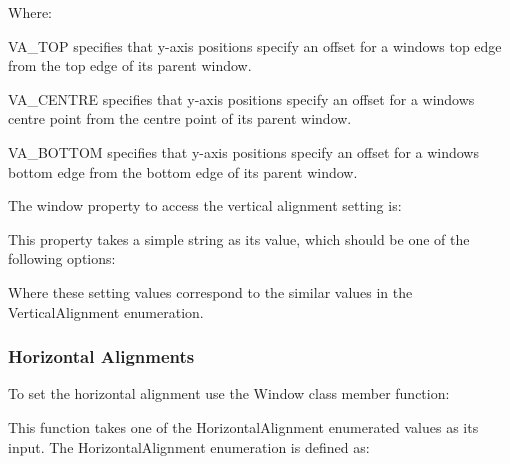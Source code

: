 Where\+: \begin{DoxyItemize}
\item {\ttfamily V\+A\+\_\+\+T\+OP} specifies that y-\/axis positions specify an offset for a window\textquotesingle{}s top edge from the top edge of it\textquotesingle{}s parent window. \item {\ttfamily V\+A\+\_\+\+C\+E\+N\+T\+RE} specifies that y-\/axis positions specify an offset for a window\textquotesingle{}s centre point from the centre point of it\textquotesingle{}s parent window. \item {\ttfamily V\+A\+\_\+\+B\+O\+T\+T\+OM} specifies that y-\/axis positions specify an offset for a window\textquotesingle{}s bottom edge from the bottom edge of it\textquotesingle{}s parent window.\end{DoxyItemize}
The window property to access the vertical alignment setting is\+: 
\begin{DoxyCode}{0}
\DoxyCodeLine{\textcolor{stringliteral}{"VerticalAlignment"}}
\end{DoxyCode}
 This property takes a simple string as its value, which should be one of the following options\+: 
\begin{DoxyCode}{0}
\DoxyCodeLine{\textcolor{stringliteral}{"Top"}}
\DoxyCodeLine{\textcolor{stringliteral}{"Centre"}}
\DoxyCodeLine{\textcolor{stringliteral}{"Bottom"}}
\end{DoxyCode}


Where these setting values correspond to the similar values in the Vertical\+Alignment enumeration.\hypertarget{fal_intro_fal_horz_alignments}{}\subsubsection{Horizontal Alignments}\label{fal_intro_fal_horz_alignments}
To set the horizontal alignment use the Window class member function\+: 
\begin{DoxyCode}{0}
\end{DoxyCode}


This function takes one of the Horizontal\+Alignment enumerated values as its input. The Horizontal\+Alignment enumeration is defined as\+: 
\begin{DoxyCode}{0}
\DoxyCodeLine{\{}
\DoxyCodeLine{\};}
\end{DoxyCode}


